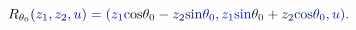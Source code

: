 \documentclass[12pt]{article}
\begin{document}
\makeatletter
\renewcommand*{\@textcolor}[3]{%
  \protect\leavevmode
  \begingroup
    \color#1{#2}#3%
  \endgroup
}
\makeatother
\begin{displaymath}
\mathcolor[RGB]{0,0,15}{R} _ { \mathcolor[RGB]{0,0,30}{\theta} _ { \mathcolor[RGB]{0,0,45}{0} } } \mathcolor[RGB]{0,0,60}{(} \mathcolor[RGB]{0,0,75}{z} _ { \mathcolor[RGB]{0,0,90}{1} } \mathcolor[RGB]{0,0,105}{,} \mathcolor[RGB]{0,0,120}{z} _ { \mathcolor[RGB]{0,0,135}{2} } \mathcolor[RGB]{0,0,150}{,} \mathcolor[RGB]{0,0,165}{u} \mathcolor[RGB]{0,0,180}{)} \mathcolor[RGB]{0,0,195}{=} \mathcolor[RGB]{0,0,210}{(} \mathcolor[RGB]{0,0,225}{z} _ { \mathcolor[RGB]{0,0,240}{1} } \mathrm { \mathcolor[RGB]{0,0,255}{c} \mathcolor[RGB]{0,15,0}{o} \mathcolor[RGB]{0,15,15}{s} } \mathcolor[RGB]{0,15,30}{\theta} _ { \mathcolor[RGB]{0,15,45}{0} } \mathcolor[RGB]{0,15,60}{-} \mathcolor[RGB]{0,15,75}{z} _ { \mathcolor[RGB]{0,15,90}{2} } \mathrm { \mathcolor[RGB]{0,15,105}{s} \mathcolor[RGB]{0,15,120}{i} \mathcolor[RGB]{0,15,135}{n} } \mathcolor[RGB]{0,15,150}{\theta} _ { \mathcolor[RGB]{0,15,165}{0} } \mathcolor[RGB]{0,15,180}{,} \mathcolor[RGB]{0,15,195}{z} _ { \mathcolor[RGB]{0,15,210}{1} } \mathrm { \mathcolor[RGB]{0,15,225}{s} \mathcolor[RGB]{0,15,240}{i} \mathcolor[RGB]{0,15,255}{n} } \mathcolor[RGB]{0,30,0}{\theta} _ { \mathcolor[RGB]{0,30,15}{0} } \mathcolor[RGB]{0,30,30}{+} \mathcolor[RGB]{0,30,45}{z} _ { \mathcolor[RGB]{0,30,60}{2} } \mathrm { \mathcolor[RGB]{0,30,75}{c} \mathcolor[RGB]{0,30,90}{o} \mathcolor[RGB]{0,30,105}{s} } \mathcolor[RGB]{0,30,120}{\theta} _ { \mathcolor[RGB]{0,30,135}{0} } \mathcolor[RGB]{0,30,150}{,} \mathcolor[RGB]{0,30,165}{u} \mathcolor[RGB]{0,30,180}{)} \mathcolor[RGB]{0,30,195}{.}
\end{displaymath}
\end{document}
